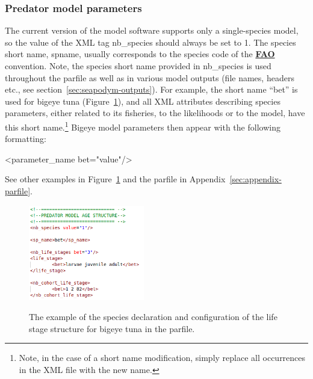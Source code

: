 \subsubsection{Predator model parameters}\label{sec:species_model}
The current version of the model software supports only a single-species model, so the value of the XML tag {\ttfamily nb\_species} should always be set to 1. The species short name, {\ttfamily spname}, usually corresponds to the species code of the \href{http://www.fao.org/fishery/statistics/tuna-catches/en}{\textbf{FAO}} convention. Note, the species short name provided in {\ttfamily nb\_species} is used throughout the parfile as well as in various model outputs (file names, headers etc., see section~\ref{sec:seapodym-outputs}). For example, the short name ``bet'' is used for bigeye tuna (Figure~\ref{fig:age_structure_parfile}), and all XML attributes describing species parameters, either related to its fisheries, to the likelihoods or to the model, have this short name.\footnote{Note, in the case of a short name modification, simply replace all occurrences in the XML file with the new name.} Bigeye model parameters then appear with the following formatting:

\begin{center}
{\ttfamily <parameter\_name bet="value"/> \\}
\end{center}

\noindent See other examples in Figure~\ref{fig:age_structure_parfile} and the parfile in Appendix~\ref{sec:appendix-parfile}. 

\begin{figure}[t]
   \centering
    \vbox{
    \includegraphics[width=0.45\textwidth]{chapter3/figs/new_print_age_structure}\\
   }
   \caption{{\bfseries} The example of the species declaration and configuration of the life stage structure for bigeye tuna in the parfile.}
   \label{fig:age_structure_parfile}
 \end{figure}


